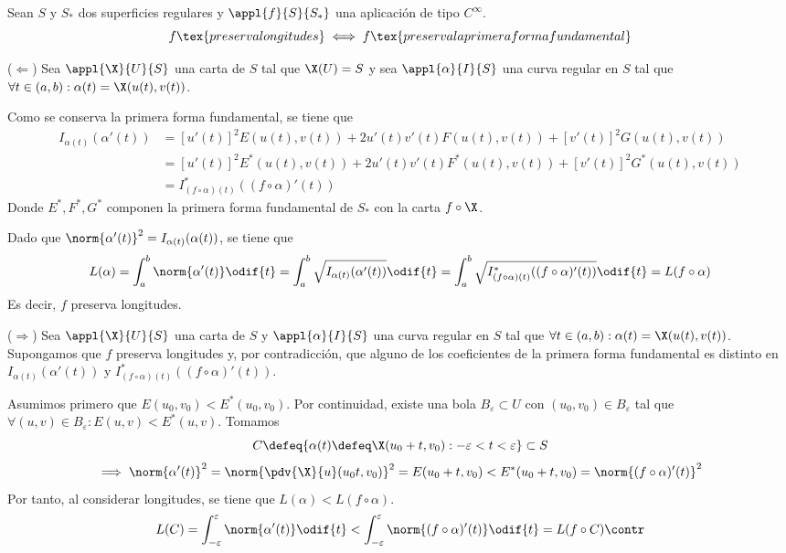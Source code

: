 \begin{lem}
	Sean $S$ y $S_*$ dos superficies regulares y $\appl{f}{S}{S_*}$ una aplicación de tipo $C^\infty$.
	\[f\tex{ preserva longitudes} \iff f \tex{ preserva la primera forma fundamental }\]
	\begin{dem}
		($\Longleftarrow$) Sea $\appl{\X}{U}{S}$ una carta de $S$ tal que $\X(U) = S$ y sea $\appl{\alpha}{I}{S}$ una curva regular en $S$ tal que $\forall t \in (a, b) : \alpha(t) = \X(u(t), v(t))$.

		Como se conserva la primera forma fundamental, se tiene que
		\[\begin{aligned}
				I_{\alpha(t)}(\alpha'(t)) & = \left[u'(t)\right]^2E(u(t), v(t)) + 2u'(t)v'(t)F(u(t), v(t)) + \left[v'(t)\right]^2G(u(t), v(t))       \\
				                          & = \left[u'(t)\right]^2E^*(u(t), v(t)) + 2u'(t)v'(t)F^*(u(t), v(t)) + \left[v'(t)\right]^2G^*(u(t), v(t)) \\
				                          & = I^*_{(f\circ \alpha)(t)}((f\circ\alpha)'(t))
			\end{aligned}\]
		Donde $E^*, F^*, G^*$ componen la primera forma fundamental de $S_*$ con la carta $f\circ\X$.

		Dado que $\norm{\alpha'(t)}^2= I_{\alpha(t)}(\alpha(t))$, se tiene que
		\[L(\alpha) = \int_{a}^{b} \norm{\alpha'(t)} \odif{t} = \int_{a}^{b} \sqrt{I_{\alpha(t)}(\alpha'(t))} \odif{t} = \int_{a}^{b} \sqrt{I^*_{(f\circ \alpha)(t)}((f\circ\alpha)'(t))} \odif{t} = L(f\circ\alpha)\]
		Es decir, $f$ preserva longitudes.

		($\Longrightarrow$) Sea $\appl{\X}{U}{S}$ una carta de $S$ y $\appl{\alpha}{I}{S}$ una curva regular en $S$ tal que $\forall t \in (a, b) : \alpha(t) = \X(u(t), v(t))$. Supongamos que $f$ preserva longitudes y, por contradicción, que alguno de los coeficientes de la primera forma fundamental es distinto en $I_{\alpha(t)}(\alpha'(t))$ y $I^*_{(f\circ \alpha)(t)}((f\circ\alpha)'(t))$.

		Asumimos primero que $E(u_0, v_0) < E^*(u_0, v_0)$. Por continuidad, existe una bola $B_\varepsilon \subset U$ con $(u_0, v_0) \in B_\varepsilon$ tal que $\forall (u, v) \in B_\varepsilon : E(u, v) < E^*(u, v)$. Tomamos
		\[C\defeq \{\alpha(t) \defeq \X(u_0+t, v_0) : -\varepsilon < t < \varepsilon\} \subset S\]
		\[\implies \norm{\alpha'(t)}^2 = \norm{\pdv{\X}{u}(u_0t, v_0)}^2=E(u_0+t, v_0) < E^*(u_0+t, v_0) = \norm{(f\circ\alpha)'(t)}^2\]
		Por tanto, al considerar longitudes, se tiene que $L(\alpha) < L(f\circ\alpha)$.
		\[L(C) = \int_{-\varepsilon}^{\varepsilon} \norm{\alpha'(t)} \odif{t} < \int_{-\varepsilon}^{\varepsilon} \norm{(f\circ\alpha)'(t)} \odif{t} = L(f\circ C) \contr\]


\end{dem}
\end{lem}
